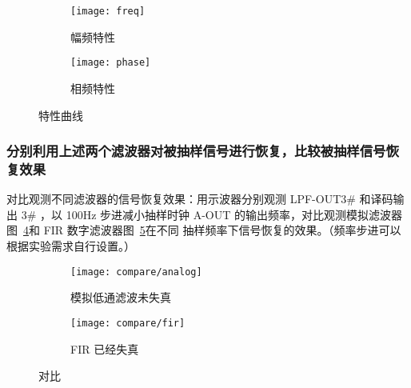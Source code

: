 \documentclass[../main]{subfiles}
\begin{document}
\begin{figure}[htbp]
  \centering
  \begin{subfigure}[htbp]{0.45\linewidth}
    \centering
    \texttt{[image: freq]}
    \caption{幅频特性}%
    \label{fig:freq}
  \end{subfigure}
  \quad
  \begin{subfigure}[htbp]{0.45\linewidth}
    \centering
    \texttt{[image: phase]}
    \caption{相频特性}%
    \label{fig:phase}
  \end{subfigure}
  \caption{特性曲线}%
  \label{fig:character}
\end{figure}

\subsubsection{分别利用上述两个滤波器对被抽样信号进行恢复，比较被抽样信号恢复效果}%
\label{ssub:recover}




对比观测不同滤波器的信号恢复效果：用示波器分别观测 LPF-OUT3\# 和译码输出 3\#
，以 100Hz 步进减小抽样时钟 A-OUT 的输出频率，对比观测模拟滤波器
图~\ref{fig:compare/analog}和 FIR 数字滤波器图~\ref{fig:compare/fir}在不同
抽样频率下信号恢复的效果。（频率步进可以根据实验需求自行设置。）

\begin{figure}[htbp]
  \centering
  \begin{subfigure}[htbp]{0.45\linewidth}
    \centering
    \texttt{[image: compare/analog]}
    \caption{模拟低通滤波未失真}%
    \label{fig:compare/analog}
  \end{subfigure}
  \quad
  \begin{subfigure}[htbp]{0.45\linewidth}
    \centering
    \texttt{[image: compare/fir]}
    \caption{FIR 已经失真}%
    \label{fig:compare/fir}
  \end{subfigure}
  \caption{对比}%
  \label{fig:compare}
\end{figure}
\end{document}
